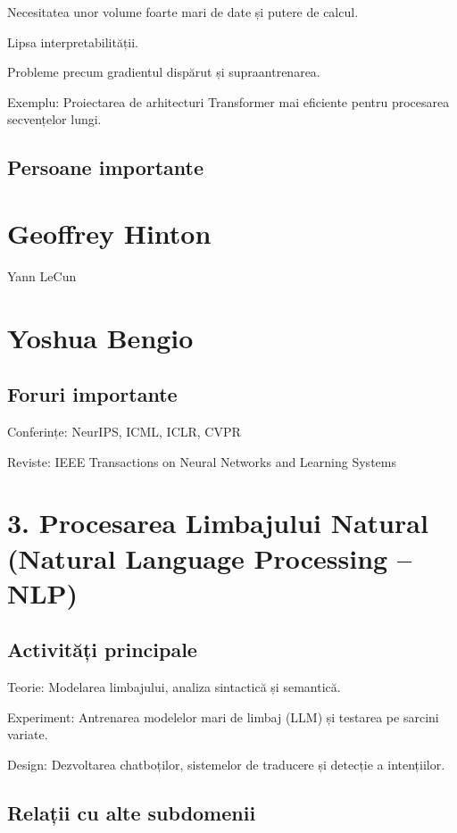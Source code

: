 \documentclass[12pt]{article}
\begin{document}
Necesitatea unor volume foarte mari de date și putere de calcul.

Lipsa interpretabilității.

Probleme precum gradientul dispărut și supraantrenarea.

Exemplu: Proiectarea de arhitecturi Transformer mai eficiente pentru procesarea secvențelor lungi.

\subsection*{Persoane importante}

\section*{Geoffrey Hinton}

Yann LeCun

\section*{Yoshua Bengio}

\subsection*{Foruri importante}

Conferințe: NeurIPS, ICML, ICLR, CVPR

Reviste: IEEE Transactions on Neural Networks and Learning Systems

\section{3. Procesarea Limbajului Natural (Natural Language Processing – NLP)}

\subsection*{Activități principale}

Teorie: Modelarea limbajului, analiza sintactică și semantică.

Experiment: Antrenarea modelelor mari de limbaj (LLM) și testarea pe sarcini variate.

Design: Dezvoltarea chatboților, sistemelor de traducere și detecție a intențiilor.

\subsection*{Relații cu alte subdomenii}
\end{document}
